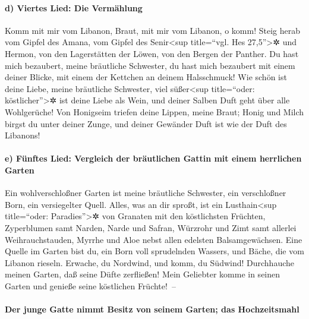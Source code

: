 \hypertarget{d-viertes-lied-die-vermuxe4hlung}{%
\paragraph{d) Viertes Lied: Die
Vermählung}\label{d-viertes-lied-die-vermuxe4hlung}}

Komm mit mir vom Libanon, Braut, mit mir vom Libanon, o
komm! Steig herab vom Gipfel des Amana, vom Gipfel des
Senir\textless sup title=``vgl. Hes 27,5''\textgreater✲ und Hermon, von
den Lagerstätten der Löwen, von den Bergen der Panther. Du
hast mich bezaubert, meine bräutliche Schwester, du hast mich bezaubert
mit einem deiner Blicke, mit einem der Kettchen an deinem Halsschmuck!
Wie schön ist deine Liebe, meine bräutliche Schwester,
viel süßer\textless sup title=``oder: köstlicher''\textgreater✲ ist
deine Liebe als Wein, und deiner Salben Duft geht über alle Wohlgerüche!
Von Honigseim triefen deine Lippen, meine Braut; Honig
und Milch birgst du unter deiner Zunge, und deiner Gewänder Duft ist wie
der Duft des Libanons!

\hypertarget{e-fuxfcnftes-lied-vergleich-der-bruxe4utlichen-gattin-mit-einem-herrlichen-garten}{%
\paragraph{e) Fünftes Lied: Vergleich der bräutlichen Gattin mit einem
herrlichen
Garten}\label{e-fuxfcnftes-lied-vergleich-der-bruxe4utlichen-gattin-mit-einem-herrlichen-garten}}

Ein wohlverschloßner Garten ist meine bräutliche
Schwester, ein verschloßner Born, ein versiegelter Quell.
Alles, was an dir sproßt, ist ein Lusthain\textless sup
title=``oder: Paradies''\textgreater✲ von Granaten mit den köstlichsten
Früchten, Zyperblumen samt Narden, Narde und Safran,
Würzrohr und Zimt samt allerlei Weihrauchstauden, Myrrhe und Aloe nebst
allen edelsten Balsamgewächsen. Eine Quelle im Garten
bist du, ein Born voll sprudelnden Wassers, und Bäche, die vom Libanon
rieseln. Erwache, du Nordwind, und komm, du Südwind!
Durchhauche meinen Garten, daß seine Düfte zerfließen! Mein Geliebter
komme in seinen Garten und genieße seine köstlichen Früchte!~--

\hypertarget{der-junge-gatte-nimmt-besitz-von-seinem-garten-das-hochzeitsmahl}{%
\paragraph{Der junge Gatte nimmt Besitz von seinem Garten; das
Hochzeitsmahl}\label{der-junge-gatte-nimmt-besitz-von-seinem-garten-das-hochzeitsmahl}}


